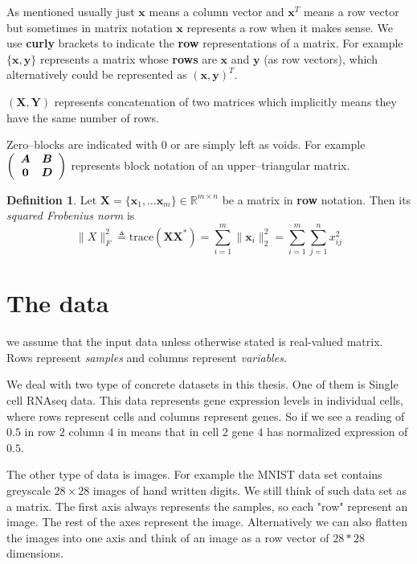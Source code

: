 \documentclass[11pt, a4paper]{report}
\theoremstyle{plain}
\theoremstyle{definition}
\newtheorem{mydef}{Definition}[chapter]
\theoremstyle{remark}
\newcommand{\R}{\mathbb{R}}
\newcommand{\X}{\mathbf{X}}
\newcommand{\x}{\mathbf{x}}
\newcommand{\Y}{\mathbf{Y}}
\newcommand{\y}{\mathbf{y}}
\newcommand{\bv}[1]{\boldsymbol{#1}}
\begin{document}
As mentioned usually just $\x$ means a column vector and $\x^T$ means a row
vector but sometimes in matrix notation $\x$ represents a row when it makes
sense.
We use \textbf{curly} brackets to indicate the \textbf{row} representations of a matrix.
For example $\{\x, \y\}$ represents a matrix whose \textbf{rows} are $\x$ and $\y$
(as row vectors), which alternatively could be represented as
$(\x, \y)^T$.

$(\X,\Y)$ represents
concatenation of two matrices which implicitly means they have the same number
of rows.

Zero--blocks are indicated with $0$ or are simply left as voids. For
example $ \left( \begin{array}{c c} \bv{A} & \bv{B} \\ \bv{0} & \bv{D}
\end{array} \right) $ represents block notation of an upper--triangular matrix.

\begin{mydef}
Let $\X = \{\x_1, \dots \x_m\} \in \R^{m \times n}$
be a matrix in \textbf{row} notation. Then its \emph{squared Frobenius norm} is
\begin{equation}
\label{def:frobnorm}
\|X\|_F^2 \triangleq \text{trace}(\X \X^*) 
= \sum_{i=1}^{m} \|\x_i\|^2_2 = \sum_{i=1}^m \sum_{j=1}^n x_{ij}^2
\end{equation}
\end{mydef}

\section{The data}
we assume that the input data unless otherwise stated is real-valued matrix.
Rows represent \emph{samples} 
and columns represent \emph{variables}.

We deal with two type of concrete datasets in this thesis. One of them is
Single cell RNAseq data. This data represents gene expression levels in 
individual cells, where rows represent cells and columns represent genes.
So if we see a reading of
$0.5$ in row $2$ column $4$ in means that in cell $2$ gene $4$ has normalized
expression of $0.5$.

The other type of data is images. For example the MNIST data set contains 
greyscale $28 \times 28$ images of hand written digits.
We still think of such data set as a matrix. The first axis always represents
the samples, so each "row" represent an image. The rest of the axes represent
the image. Alternatively we can also flatten the images into one axis and think
of an image as a row vector of $28*28$ dimensions.
\end{document}
